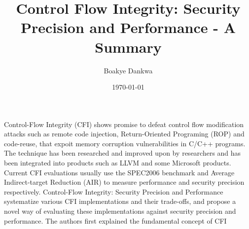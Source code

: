 \documentclass[dvips,12pt]{article}
\begin{document}

\title{Control Flow Integrity: Security Precision and Performance - A Summary}
\author{Boakye Dankwa}
\date{\today}



\maketitle


Control-Flow Integrity (CFI) shows promise to defeat control flow modification attacks such as remote code injection, Return-Oriented Programing (ROP) and code-reuse, that expoit memory corruption vulnerabilities in C/C++ programs. The technique has been researched and improved upon by researchers and has been integrated into products such as LLVM and some Microsoft products. Current CFI evaluations usually use the SPEC2006 benchmark and Average Indirect-target Reduction (AIR) to measure performance and security precision respectively. Control-Flow Integrity: Security Precision and Performance \cite{DBLP:journals/corr/BurowCBPNLF16} systematize various CFI implementations and their trade-offs, and propose a novel way of evaluating these implementations against security precision and performance.
\newline
\newline
The authors first explained the fundamental concept of CFI






 





\end{document}
